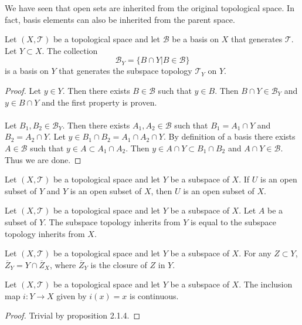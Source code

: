 We have seen that open sets are inherited from the original topological space. In fact, basis elements can also be inherited from the parent space. 

\begin{prp}{}{} Let $(X,\mathcal{T})$ be a topological space and let $\mathcal{B}$ be a basis on $X$ that generates $\mathcal{T}$. Let $Y\subset X$. The collection $$\mathcal{B}_Y=\{B\cap Y|B\in\mathcal{B}\}$$ is a basis on $Y$ that generates the subspace topology $\mathcal{T}_Y$ on $Y$. \tcbline
\begin{proof}
Let $y\in Y$. Then there exists $B\in\mathcal{B}$ such that $y\in B$. Then $B\cap Y\in\mathcal{B}_Y$ and $y\in B\cap Y$ and the first property is proven. \\~\\
Let $B_1,B_2\in\mathcal{B}_Y$. Then there exists $A_1,A_2\in\mathcal{B}$ such that $B_1=A_1\cap Y$ and $B_2=A_2\cap Y$.  Let $y\in B_1\cap B_2=A_1\cap A_2\cap Y$. By definition of a basis there exists $A\in\mathcal{B}$ such that $y\in A\subset A_1\cap A_2$. Then $y\in A\cap Y\subset B_1\cap B_2$ and $A\cap Y\in\mathcal{B}$. Thus we are done. 
\end{proof}
\end{prp}

\begin{prp}{}{} Let $(X,\mathcal{T})$ be a topological space and let $Y$ be a subspace of $X$. If $U$ is an open subset of $Y$ and $Y$ is an open subset of $X$, then $U$ is an open subset of $X$. 
\end{prp}

\begin{prp}{}{} Let $(X,\mathcal{T})$ be a topological space and let $Y$ be a subspace of $X$. Let $A$ be a subset of $Y$. The subspace topology inherits from $Y$ is equal to the subspace topology inherits from $X$. 
\end{prp}

\begin{prp}{}{} Let $(X,\mathcal{T})$ be a topological space and let $Y$ be a subspace of $X$. For any $Z\subset Y$, $\overline{Z}_Y=Y\cap\overline{Z}_X$, where $\overline{Z}_Y$ is the closure of $Z$ in $Y$. 
\end{prp}

\begin{prp}{}{} Let $(X,\mathcal{T})$ be a topological space and let $Y$ be a subspace of $X$. The inclusion map $i:Y\to X$ given by $i(x)=x$ is continuous. \tcbline
\begin{proof}
Trivial by proposition 2.1.4. 
\end{proof}
\end{prp}

